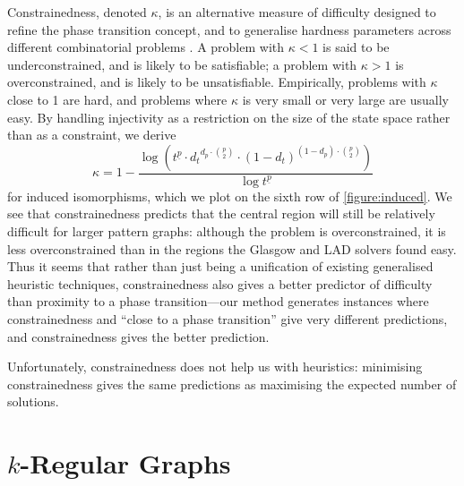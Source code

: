 \documentclass[twoside,11pt]{article}
\newcommand{\citep}[1]{\cite{#1}}
\begin{document}
Constrainedness, denoted $\kappa$, is an alternative measure of difficulty designed to refine the
phase transition concept, and to generalise hardness parameters across different combinatorial
problems \citep{DBLP:conf/aaai/GentMPW96}. A problem with $\kappa < 1$ is said to be underconstrained, and is
likely to be satisfiable; a problem with $\kappa > 1$ is overconstrained, and is likely to be
unsatisfiable. Empirically, problems with $\kappa$ close to 1 are hard, and problems where $\kappa$
is very small or very large are usually easy. By handling injectivity as a restriction on the size
of the state space rather than as a constraint, we derive
\begin{equation}\label{equation:constrainedness}\kappa = 1 - \frac{\log \left(
t^{\underline{p}} \cdot {d_t}^{d_p \cdot \binom{p}{2}} \cdot {(1 - d_{t})}^{(1 - d_{p}) \cdot
\binom{p}{2}} \right)}{\log t^{\underline{p}}} \end{equation} for induced isomorphisms, which we plot on the
sixth row of \cref{figure:induced}. We see that constrainedness predicts that the central region
will still be relatively difficult for larger pattern graphs: although the problem is
overconstrained, it is less overconstrained than in the regions the Glasgow and LAD solvers found
easy.  Thus it seems that rather than just being a unification of existing generalised heuristic
techniques, constrainedness also gives a better predictor of difficulty than proximity to a phase
transition---our method generates instances where constrainedness and ``close to a phase
transition'' give very different predictions, and constrainedness gives the better prediction.

Unfortunately, constrainedness does not help us with heuristics: minimising constrainedness gives
the same predictions as maximising the expected number of solutions.

\section{$k$-Regular Graphs}\label{section:regular}
\end{document}
